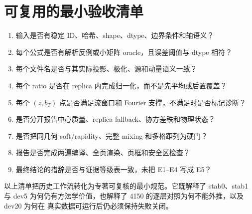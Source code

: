 \section{可复用的最小验收清单}

\begin{enumerate}
  \item 输入是否有稳定 ID、哈希、shape、dtype、边界条件和轴语义？
  \item 每个公式是否有解析反例或小矩阵 oracle，且误差阈值与 dtype 相符？
  \item 每个文件名是否与其实际投影、极化、源和动量语义一致？
  \item 每个 ratio 是否在 replica 内完成归一化，而不是先平均或后置覆盖？
  \item 每个 \((z,b_T)\) 点是否满足流窗口和 Fourier 支撑，不满足时是否标记诊断？
  \item 是否分开报告中心质量、replica fallback、协方差秩和物理状态？
  \item 是否把同几何 soft/rapidity、完整 mixing 和多格距列为硬门？
  \item 报告是否完成两遍编译、全页渲染、页框和安全区检查？
  \item 最终结论的措辞是否与证据等级表一致，未把 E1--E4 写成 E5？
\end{enumerate}

以上清单把历史工作流转化为专著可复核的最小规范。它既解释了
stab0、stab1 与 dev5
为何仍有方法学价值，也解释了 4150 的逐层对照为何不能外推，以及 dev20 为何在
真实数据可运行后仍必须保持失败关闭。
